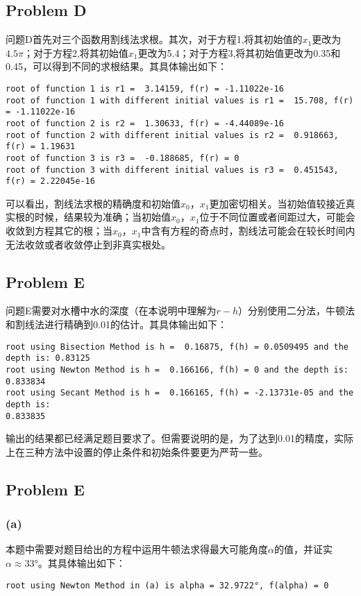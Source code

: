 \documentclass{ctexart}
\begin{document}
\begin{sloppypar}
\subsection*{Problem D}
问题D首先对三个函数用割线法求根。其次，对于方程1,将其初始值的$x_1$更改为$4.5\pi$；对于方程2,将其初始值$x_1$更改为5.4；对于方程3,将其初始值更改为0.35和0.45，可以得到不同的求根结果。其具体输出如下：
\begin{shaded}
\begin{verbatim}
root of function 1 is r1 =  3.14159, f(r) = -1.11022e-16
root of function 1 with different initial values is r1 =  15.708, f(r) = -1.11022e-16
root of function 2 is r2 =  1.30633, f(r) = -4.44089e-16
root of function 2 with different initial values is r2 =  0.918663, f(r) = 1.19631
root of function 3 is r3 =  -0.188685, f(r) = 0
root of function 3 with different initial values is r3 =  0.451543, f(r) = 2.22045e-16
\end{verbatim}
\end{shaded}
可以看出，割线法求根的精确度和初始值$x_0$，$x_1$更加密切相关。当初始值较接近真实根的时候，结果较为准确；当初始值$x_0$，$x_1$位于不同位置或者间距过大，可能会收敛到方程其它的根；当$x_0$，$x_1$中含有方程的奇点时，割线法可能会在较长时间内无法收敛或者收敛停止到非真实根处。

\subsection*{Problem E}
问题E需要对水槽中水的深度（在本说明中理解为$r-h$）分别使用二分法，牛顿法和割线法进行精确到0.01的估计。其具体输出如下：
\begin{shaded}
\begin{verbatim}
root using Bisection Method is h =  0.16875, f(h) = 0.0509495 and the depth is: 0.83125
root using Newton Method is h =  0.166166, f(h) = 0 and the depth is: 0.833834
root using Secant Method is h =  0.166165, f(h) = -2.13731e-05 and the depth is:
0.833835
\end{verbatim}
\end{shaded}
输出的结果都已经满足题目要求了。但需要说明的是，为了达到0.01的精度，实际上在三种方法中设置的停止条件和初始条件要更为严苛一些。

\subsection*{Problem E}
\subsubsection*{(a)}
本题中需要对题目给出的方程中运用牛顿法求得最大可能角度$\alpha$的值，并证实$\alpha \approx33°$。其具体输出如下：
\begin{shaded}
\begin{verbatim}
root using Newton Method in (a) is alpha = 32.9722°, f(alpha) = 0
\end{verbatim}
\end{shaded}

\end{sloppypar}
\end{document}
